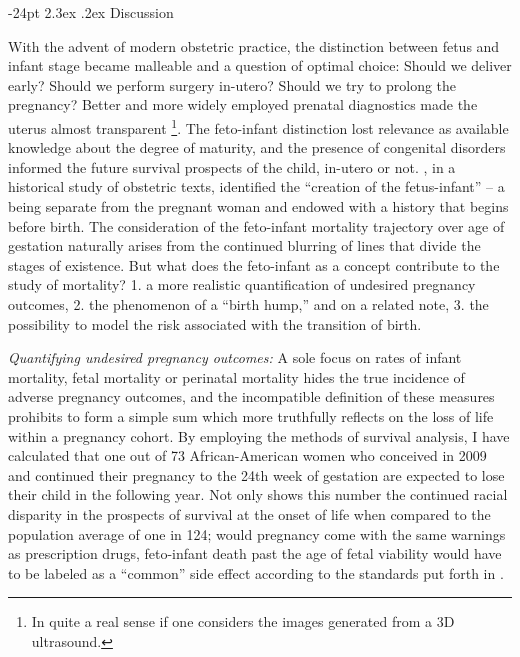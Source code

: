 \documentclass[10pt, twoside]{article}
\makeatletter
\renewcommand\section{\@startsection {section}{1}{\z@}%
                                   {-24pt}%
                                   {2.3ex \@plus.2ex}%
                                   {\normalfont\large\bfseries}}
\let\oldfootnote\footnote
\renewcommand\footnote[1]{%
\oldfootnote{\hspace{0.6mm}#1}}
\makeatother
\begin{document}
\hypertarget{discussion}{%
\section{Discussion}\label{discussion}}

With the advent of modern obstetric practice, the distinction between fetus and infant stage became malleable and a question of optimal choice: Should we deliver early? Should we perform surgery in-utero? Should we try to prolong the pregnancy? Better and more widely employed prenatal diagnostics made the uterus almost transparent\footnote{In quite a real sense if one considers the images generated from a 3D ultrasound.}. The feto-infant distinction lost relevance as available knowledge about the degree of maturity, and the presence of congenital disorders informed the future survival prospects of the child, in-utero or not. \citet{Isaacson1996}, in a historical study of obstetric texts, identified the ``creation of the fetus-infant'' -- a being separate from the pregnant woman and endowed with a history that begins before birth. The consideration of the feto-infant mortality trajectory over age of gestation naturally arises from the continued blurring of lines that divide the stages of existence. But what does the feto-infant as a concept contribute to the study of mortality? 1. a more realistic quantification of undesired pregnancy outcomes, 2. the phenomenon of a ``birth hump,'' and on a related note, 3. the possibility to model the risk associated with the transition of birth.

\emph{Quantifying undesired pregnancy outcomes:} A sole focus on rates of infant mortality, fetal mortality or perinatal mortality hides the true incidence of adverse pregnancy outcomes, and the incompatible definition of these measures prohibits to form a simple sum which more truthfully reflects on the loss of life within a pregnancy cohort. By employing the methods of survival analysis, I have calculated that one out of 73 African-American women who conceived in 2009 and continued their pregnancy to the 24th week of gestation are expected to lose their child in the following year. Not only shows this number the continued racial disparity in the prospects of survival at the onset of life when compared to the population average of one in 124; would pregnancy come with the same warnings as prescription drugs, feto-infant death past the age of fetal viability would have to be labeled as a ``common'' side effect according to the standards put forth in \citet{CIOMSWGIIIV1999}.
\end{document}
